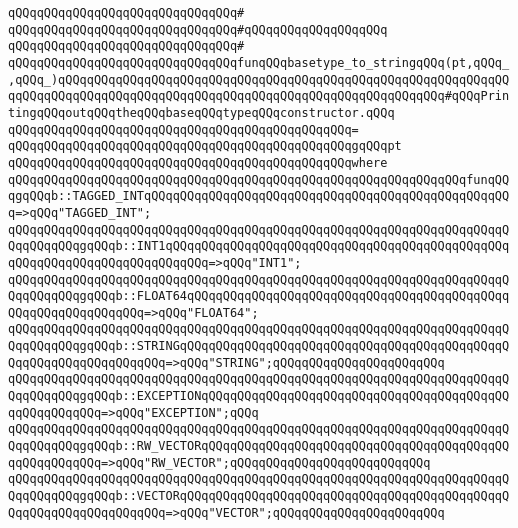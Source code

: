 \verb|qQQqqQQqqQQqqQQqqQQqqQQqqQQqqQQq#|\newline
\verb|qQQqqQQqqQQqqQQqqQQqqQQqqQQqqQQq#qQQqqQQqqQQqqQQqqQQq|\newline
\verb|qQQqqQQqqQQqqQQqqQQqqQQqqQQqqQQq#|\newline
\verb|qQQqqQQqqQQqqQQqqQQqqQQqqQQqqQQqfunqQQqbasetype_to_stringqQQq(pt,qQQq_,qQQq_)qQQqqQQqqQQqqQQqqQQqqQQqqQQqqQQqqQQqqQQqqQQqqQQqqQQqqQQqqQQqqQQqqQQqqQQqqQQqqQQqqQQqqQQqqQQqqQQqqQQqqQQqqQQqqQQqqQQqqQQqqQQq#qQQqPrintingqQQqoutqQQqtheqQQqbaseqQQqtypeqQQqconstructor.qQQq|\newline
\verb|qQQqqQQqqQQqqQQqqQQqqQQqqQQqqQQqqQQqqQQqqQQqqQQq=|\newline
\verb|qQQqqQQqqQQqqQQqqQQqqQQqqQQqqQQqqQQqqQQqqQQqqQQqgqQQqpt|\newline
\verb|qQQqqQQqqQQqqQQqqQQqqQQqqQQqqQQqqQQqqQQqqQQqqQQqwhere|\newline
\verb|qQQqqQQqqQQqqQQqqQQqqQQqqQQqqQQqqQQqqQQqqQQqqQQqqQQqqQQqqQQqqQQqfunqQQqgqQQqb::TAGGED_INTqQQqqQQqqQQqqQQqqQQqqQQqqQQqqQQqqQQqqQQqqQQqqQQqqQQq=>qQQq"TAGGED_INT";|\newline
\verb|qQQqqQQqqQQqqQQqqQQqqQQqqQQqqQQqqQQqqQQqqQQqqQQqqQQqqQQqqQQqqQQqqQQqqQQqqQQqqQQqgqQQqb::INT1qQQqqQQqqQQqqQQqqQQqqQQqqQQqqQQqqQQqqQQqqQQqqQQqqQQqqQQqqQQqqQQqqQQqqQQqqQQq=>qQQq"INT1";|\newline
\verb|qQQqqQQqqQQqqQQqqQQqqQQqqQQqqQQqqQQqqQQqqQQqqQQqqQQqqQQqqQQqqQQqqQQqqQQqqQQqqQQqgqQQqb::FLOAT64qQQqqQQqqQQqqQQqqQQqqQQqqQQqqQQqqQQqqQQqqQQqqQQqqQQqqQQqqQQqqQQq=>qQQq"FLOAT64";|\newline
\verb|qQQqqQQqqQQqqQQqqQQqqQQqqQQqqQQqqQQqqQQqqQQqqQQqqQQqqQQqqQQqqQQqqQQqqQQqqQQqqQQqgqQQqb::STRINGqQQqqQQqqQQqqQQqqQQqqQQqqQQqqQQqqQQqqQQqqQQqqQQqqQQqqQQqqQQqqQQqqQQq=>qQQq"STRING";qQQqqQQqqQQqqQQqqQQqqQQq|\newline
\verb|qQQqqQQqqQQqqQQqqQQqqQQqqQQqqQQqqQQqqQQqqQQqqQQqqQQqqQQqqQQqqQQqqQQqqQQqqQQqqQQqgqQQqb::EXCEPTIONqQQqqQQqqQQqqQQqqQQqqQQqqQQqqQQqqQQqqQQqqQQqqQQqqQQqqQQq=>qQQq"EXCEPTION";qQQq|\newline
\verb|qQQqqQQqqQQqqQQqqQQqqQQqqQQqqQQqqQQqqQQqqQQqqQQqqQQqqQQqqQQqqQQqqQQqqQQqqQQqqQQqgqQQqb::RW_VECTORqQQqqQQqqQQqqQQqqQQqqQQqqQQqqQQqqQQqqQQqqQQqqQQqqQQqqQQq=>qQQq"RW_VECTOR";qQQqqQQqqQQqqQQqqQQqqQQqqQQq|\newline
\verb|qQQqqQQqqQQqqQQqqQQqqQQqqQQqqQQqqQQqqQQqqQQqqQQqqQQqqQQqqQQqqQQqqQQqqQQqqQQqqQQqgqQQqb::VECTORqQQqqQQqqQQqqQQqqQQqqQQqqQQqqQQqqQQqqQQqqQQqqQQqqQQqqQQqqQQqqQQqqQQq=>qQQq"VECTOR";qQQqqQQqqQQqqQQqqQQqqQQq|\newline
